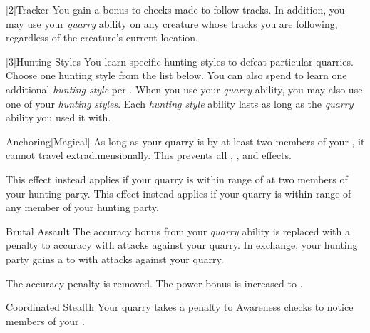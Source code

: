         [2]{Tracker}
        You gain a  bonus to checks made to follow tracks.
        In addition, you may use your \textit{quarry} ability on any creature whose tracks you are following, regardless of the creature's current location.

        [3]{Hunting Styles}
        You learn specific hunting styles to defeat particular quarries.
        Choose one hunting style from the list below.
        You can also spend  to learn one additional \textit{hunting style} per .
        When you use your \textit{quarry} ability, you may also use one of your \textit{hunting styles}.
        Each \textit{hunting style} ability lasts as long as the \textit{quarry} ability you used it with.
        {
            \begin{freeability}{Anchoring}[Magical]
                As long as your quarry is  by at least two members of your , it cannot travel extradimensionally.
                This prevents all , , and  effects.

                \rankline
                 This effect instead applies if your quarry is within \rngmed range of at two members of your hunting party.
                 This effect instead applies if your quarry is within \rnglong range of any member of your hunting party.
            \end{freeability}

            \begin{freeability}{Brutal Assault}
                The accuracy bonus from your \textit{quarry} ability is replaced with a  penalty to accuracy with  attacks against your quarry.
                In exchange, your hunting party gains a   to  with  attacks against your quarry.

                \rankline
                 The accuracy penalty is removed.
                 The power bonus is increased to .
            \end{freeability}

            \begin{freeability}{Coordinated Stealth}
                Your quarry takes a  penalty to Awareness checks to notice members of your .


\end{freeability}}
